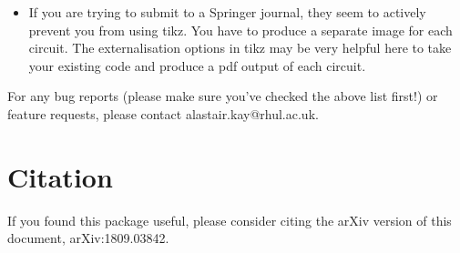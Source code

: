 \documentclass[aps,pra,10pt,nofootinbib]{revtex4-2}
\begin{document}
\begin{itemize}
\item If you are trying to submit to a Springer journal, they seem to actively prevent you from using tikz. You have to produce a separate image for each circuit. The externalisation options in tikz may be very helpful here to take your existing code and produce a pdf output of each circuit.
\end{itemize}

For any bug reports (please make sure you've checked the above list first!) or feature requests, please contact alastair.kay@rhul.ac.uk.

\section{Citation}

If you found this package useful, please consider citing the arXiv version of this document, arXiv:1809.03842.
\end{document}
